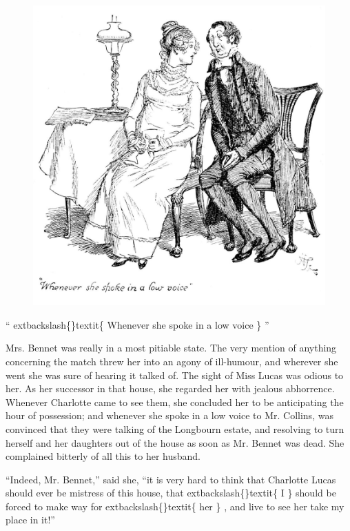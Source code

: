 \documentclass[10pt]{book}
\begin{document}
\begin{figure}[h]
\centering
\includegraphics[width=\linewidth]{images/i_195.jpg}
\end{figure}

     “
     	extbackslash\{\}textit\{
      Whenever she spoke in a low voice
     \}
     ”
    

   Mrs. Bennet was really in a most pitiable state. The very mention of
anything concerning the match threw her into an agony of ill-humour, and
wherever she went she was sure of hearing it talked of. The sight of
Miss Lucas was odious to her. As her successor in that house, she
   regarded her with jealous abhorrence. Whenever Charlotte came to see
them, she concluded her to be anticipating the hour of possession; and
whenever she spoke in a low voice to Mr. Collins, was convinced that
they were talking of the Longbourn estate, and resolving to turn herself
and her daughters out of the house as soon as Mr. Bennet was dead. She
complained bitterly of all this to her husband.
  

   “Indeed, Mr. Bennet,” said she, “it is very hard to think that Charlotte
Lucas should ever be mistress of this house, that
   	extbackslash\{\}textit\{
    I
   \}
   should be forced
to make way for
   	extbackslash\{\}textit\{
    her
   \}
   , and live to see her take my place in it!”
  
\end{document}
